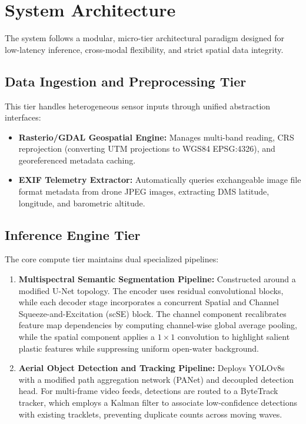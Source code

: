 \documentclass[conference]{IEEEtran}
\begin{document}
\section{System Architecture}

The system follows a modular, micro-tier architectural paradigm designed for low-latency inference, cross-modal flexibility, and strict spatial data integrity.

\subsection{Data Ingestion and Preprocessing Tier}
This tier handles heterogeneous sensor inputs through unified abstraction interfaces:
\begin{itemize}
    \item \textbf{Rasterio/GDAL Geospatial Engine:} Manages multi-band reading, CRS reprojection (converting UTM projections to WGS84 EPSG:4326), and georeferenced metadata caching.
    \item \textbf{EXIF Telemetry Extractor:} Automatically queries exchangeable image file format metadata from drone JPEG images, extracting DMS latitude, longitude, and barometric altitude.
\end{itemize}

\subsection{Inference Engine Tier}
The core compute tier maintains dual specialized pipelines:
\begin{enumerate}
    \item \textbf{Multispectral Semantic Segmentation Pipeline:} 
    Constructed around a modified U-Net topology. The encoder uses residual convolutional blocks, while each decoder stage incorporates a concurrent Spatial and Channel Squeeze-and-Excitation (scSE) block. The channel component recalibrates feature map dependencies by computing channel-wise global average pooling, while the spatial component applies a $1 \times 1$ convolution to highlight salient plastic features while suppressing uniform open-water background.
    \item \textbf{Aerial Object Detection and Tracking Pipeline:}
    Deploys YOLOv8s with a modified path aggregation network (PANet) and decoupled detection head. For multi-frame video feeds, detections are routed to a ByteTrack tracker, which employs a Kalman filter to associate low-confidence detections with existing tracklets, preventing duplicate counts across moving waves.
\end{enumerate}
\end{document}
